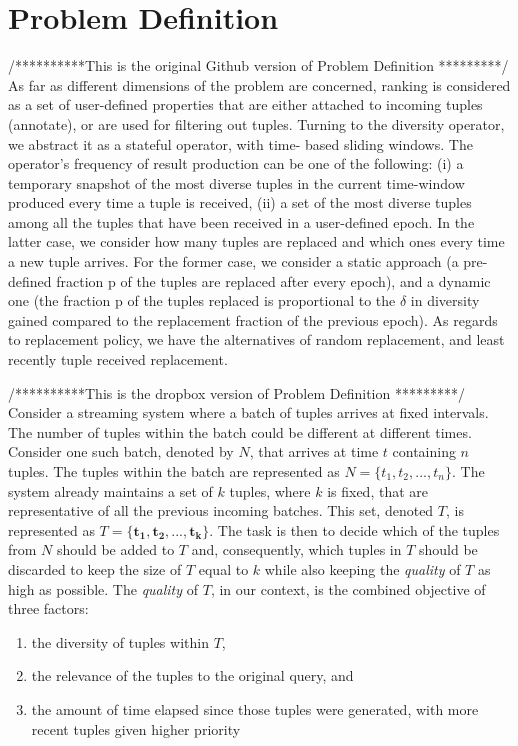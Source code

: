 \section{Problem Definition}

/**********This is the original Github version of Problem Definition *********/
\indent As far as different dimensions of the problem are concerned, ranking is
considered as a set of user-defined properties that are either attached to
incoming tuples (annotate), or are used for filtering out tuples. Turning
to the diversity operator, we abstract it as a stateful operator, with time-
based sliding windows. The operator's frequency of result production
can be one of the following: (i) a temporary snapshot of the most diverse
tuples in the current time-window produced every time a tuple is received,
(ii) a set of the most diverse tuples among all the tuples that have been
received in a user-defined epoch. In the latter case, we consider how
many tuples are replaced and which ones every time a new tuple arrives.
For the former case, we consider a static approach (a pre-defined fraction
p of the tuples are replaced after every epoch), and a dynamic one (the
fraction p of the tuples replaced is proportional to the $\delta$ in diversity gained
compared to the replacement fraction of the previous epoch). As regards
to replacement policy, we have the alternatives of random replacement,
and least recently tuple received replacement.


/**********This is the dropbox version of Problem Definition *********/
Consider a streaming system where a batch of tuples arrives at fixed intervals. The number of tuples within the batch could be different at different times. Consider one such batch, denoted by $N$, that arrives at time $t$ containing $n$  tuples. The tuples within the batch are represented as $N=\{t_1,t_2,...,t_n\}$. The system already maintains a set of $k$ tuples, where $k$ is fixed, that are representative of all the previous incoming batches. This set, denoted $T$, is represented as $T=\{\mathbf{t_1},\mathbf{t_2},...,\mathbf{t_k}\}$. The task is then to decide which of the tuples from $N$ should be  added to $T$ and, consequently, which tuples in $T$ should be discarded to keep the size of $T$ equal to $k$ while also keeping the \textit{quality} of $T$ as high as possible. The \textit{quality} of $T$, in our context, is the combined objective of three factors:
\begin{enumerate}
\item the diversity of tuples within $T$, 
\item the relevance of the tuples to the original query, and 
\item the amount of time elapsed since those tuples were generated, with more recent tuples given higher priority
\end{enumerate}